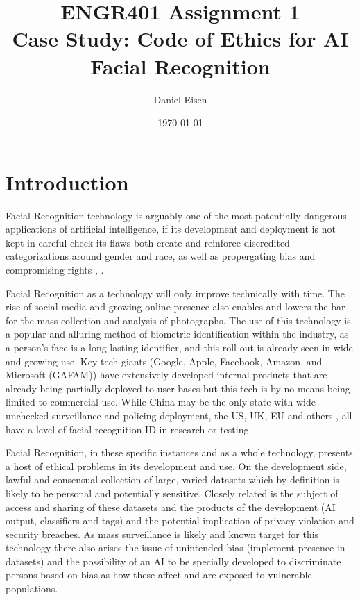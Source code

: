 \documentclass[11pt]{article}
\title{ENGR401 Assignment 1 \\ Case Study: Code of Ethics for AI \\ Facial Recognition}
\author{Daniel Eisen}
\date{\today}
\begin{document}
\maketitle
\section{Introduction}

Facial Recognition technology is arguably one of the most potentially dangerous applications of artificial intelligence, if its development and deployment is not kept in careful check its flaws both create and reinforce discredited categorizations around gender and race, as well as propergating bias and compromising rights \cite{plutonium}, \cite{nature_main}.

Facial Recognition as a technology will only improve technically with time. The rise of social media and growing online presence also enables and lowers the bar for the mass collection and analysis of photographs. The use of this technology is a popular and alluring method of biometric identification within the industry, as a person's face is a long-lasting identifier, and this roll out is already seen in wide and growing use. Key tech giants (Google, Apple, Facebook, Amazon, and Microsoft (GAFAM)) have extensively developed internal products that are already being partially deployed to user bases \cite{thales} but this tech is by no means being limited to commercial use. While China may be the only state with wide unchecked surveillance and policing deployment, the US, UK, EU and others \cite{nature_main},\cite{thales} all have a level of facial recognition ID in research or testing.  

Facial Recognition, in these specific instances and as a whole technology, presents a host of ethical problems in its development and use. On the development side, lawful and consensual collection of large, varied datasets which by definition is likely to be personal and potentially sensitive. Closely related is the subject of access and sharing of these datasets and the products of the development (AI output, classifiers and tags) and the potential implication of privacy violation and security breaches. As mass surveillance is likely and known target for this technology there also arises the issue of unintended bias (implement presence in datasets) and the possibility of an AI to be specially developed to discriminate persons based on bias as how these affect and are exposed to vulnerable populations.
\end{document}
